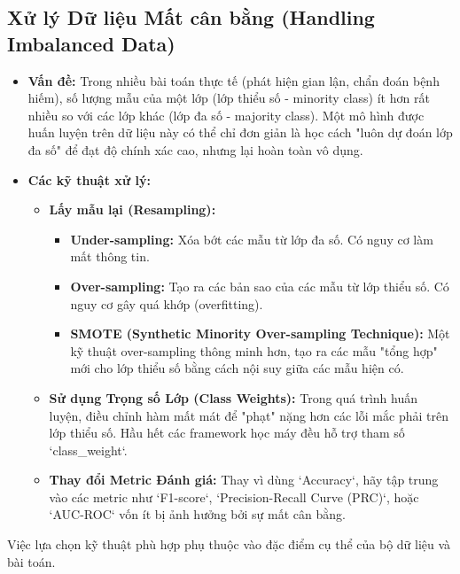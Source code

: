 \subsection{Xử lý Dữ liệu Mất cân bằng (Handling Imbalanced Data)}
\label{ssec:imbalanced_data}
\begin{itemize}
    \item \textbf{Vấn đề:} Trong nhiều bài toán thực tế (phát hiện gian lận, chẩn đoán bệnh hiếm), số lượng mẫu của một lớp (lớp thiểu số - minority class) ít hơn rất nhiều so với các lớp khác (lớp đa số - majority class). Một mô hình được huấn luyện trên dữ liệu này có thể chỉ đơn giản là học cách "luôn dự đoán lớp đa số" để đạt độ chính xác cao, nhưng lại hoàn toàn vô dụng.
    \item \textbf{Các kỹ thuật xử lý:}
        \begin{itemize}
            \item \textbf{Lấy mẫu lại (Resampling):}
                \begin{itemize}
                    \item \textbf{Under-sampling:} Xóa bớt các mẫu từ lớp đa số. Có nguy cơ làm mất thông tin.
                    \item \textbf{Over-sampling:} Tạo ra các bản sao của các mẫu từ lớp thiểu số. Có nguy cơ gây quá khớp (overfitting).
                    \item \textbf{SMOTE (Synthetic Minority Over-sampling Technique):} Một kỹ thuật over-sampling thông minh hơn, tạo ra các mẫu "tổng hợp" mới cho lớp thiểu số bằng cách nội suy giữa các mẫu hiện có.
                \end{itemize}
            \item \textbf{Sử dụng Trọng số Lớp (Class Weights):} Trong quá trình huấn luyện, điều chỉnh hàm mất mát để "phạt" nặng hơn các lỗi mắc phải trên lớp thiểu số. Hầu hết các framework học máy đều hỗ trợ tham số `class\_weight`.
            \item \textbf{Thay đổi Metric Đánh giá:} Thay vì dùng `Accuracy`, hãy tập trung vào các metric như `F1-score`, `Precision-Recall Curve (PRC)`, hoặc `AUC-ROC` vốn ít bị ảnh hưởng bởi sự mất cân bằng.
        \end{itemize}
\end{itemize}
Việc lựa chọn kỹ thuật phù hợp phụ thuộc vào đặc điểm cụ thể của bộ dữ liệu và bài toán.